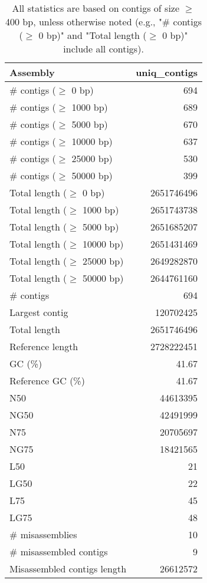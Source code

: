 \documentclass[12pt,a4paper]{article}
\begin{document}
\begin{table}[ht]
\begin{center}
\caption{All statistics are based on contigs of size $\geq$ 400 bp, unless otherwise noted (e.g., "\# contigs ($\geq$ 0 bp)" and "Total length ($\geq$ 0 bp)" include all contigs).}
\begin{tabular}{|l*{1}{|r}|}
\hline
Assembly & uniq\_contigs \\ \hline
\# contigs ($\geq$ 0 bp) & 694 \\ \hline
\# contigs ($\geq$ 1000 bp) & 689 \\ \hline
\# contigs ($\geq$ 5000 bp) & 670 \\ \hline
\# contigs ($\geq$ 10000 bp) & 637 \\ \hline
\# contigs ($\geq$ 25000 bp) & 530 \\ \hline
\# contigs ($\geq$ 50000 bp) & 399 \\ \hline
Total length ($\geq$ 0 bp) & 2651746496 \\ \hline
Total length ($\geq$ 1000 bp) & 2651743738 \\ \hline
Total length ($\geq$ 5000 bp) & 2651685207 \\ \hline
Total length ($\geq$ 10000 bp) & 2651431469 \\ \hline
Total length ($\geq$ 25000 bp) & 2649282870 \\ \hline
Total length ($\geq$ 50000 bp) & 2644761160 \\ \hline
\# contigs & 694 \\ \hline
Largest contig & 120702425 \\ \hline
Total length & 2651746496 \\ \hline
Reference length & 2728222451 \\ \hline
GC (\%) & 41.67 \\ \hline
Reference GC (\%) & 41.67 \\ \hline
N50 & 44613395 \\ \hline
NG50 & 42491999 \\ \hline
N75 & 20705697 \\ \hline
NG75 & 18421565 \\ \hline
L50 & 21 \\ \hline
LG50 & 22 \\ \hline
L75 & 45 \\ \hline
LG75 & 48 \\ \hline
\# misassemblies & 10 \\ \hline
\# misassembled contigs & 9 \\ \hline
Misassembled contigs length & 26612572 \\ \hline

\end{tabular}
\end{center}
\end{table}
\end{document}
